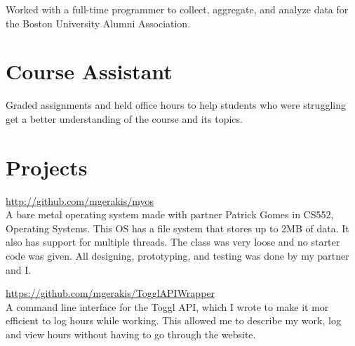 \documentclass[letterpaper]{deedy-resume} %
\begin{document}
\begin{minipage}[t]{0.66\textwidth}

    \begin{tightitemize}
      \item Worked with a full-time programmer to collect, aggregate, and analyze data for the Boston University Alumni Association.
    \end{tightitemize}

    \sectionspace %


    \section{Course Assistant}


    Graded assignments and held office hours to help students who were struggling get a better understanding of the course and its topics.

    \sectionspace %


    \section{Projects} 

    \url{http://github.com/mgerakis/myos} \\
    A bare metal operating system made with partner Patrick Gomes in CS552, Operating Systems. This OS has a file system that stores up to 2MB of data. It also has support for multiple threads. The class was very loose and no starter code was given. All designing, prototyping, and testing was done by my partner and I.

    \sectionspace %


    \url{https://github.com/mgerakis/TogglAPIWrapper} \\
    A command line interface for the Toggl API, which I wrote to make it mor efficient to log hours while working. This allowed me to describe my work, log and view hours without having to go through the website.


\end{minipage}
\end{document}
